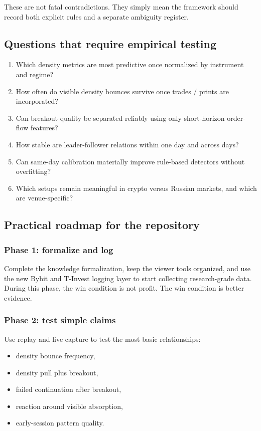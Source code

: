 These are not fatal contradictions. They simply mean the framework should record both explicit
rules and a separate ambiguity register.

\subsection{Questions that require empirical testing}

\begin{enumerate}[leftmargin=1.4em]
  \item Which density metrics are most predictive once normalized by instrument and regime?
  \item How often do visible density bounces survive once trades / prints are incorporated?
  \item Can breakout quality be separated reliably using only short-horizon order-flow features?
  \item How stable are leader-follower relations within one day and across days?
  \item Can same-day calibration materially improve rule-based detectors without overfitting?
  \item Which setups remain meaningful in crypto versus Russian markets, and which are venue-specific?
\end{enumerate}

\subsection{Practical roadmap for the repository}

\subsubsection{Phase 1: formalize and log}

Complete the knowledge formalization, keep the viewer tools organized, and use the new Bybit and
T-Invest logging layer to start collecting research-grade data. During this phase, the win
condition is not profit. The win condition is better evidence.

\subsubsection{Phase 2: test simple claims}

Use replay and live capture to test the most basic relationships:

\begin{itemize}[leftmargin=1.4em]
  \item density bounce frequency,
  \item density pull plus breakout,
  \item failed continuation after breakout,
  \item reaction around visible absorption,
  \item early-session pattern quality.
\end{itemize}

